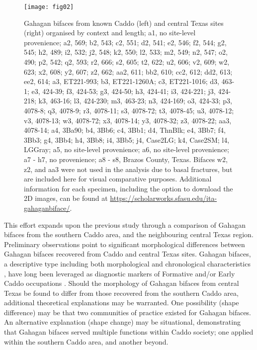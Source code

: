 \documentclass[review]{elsarticle}
\begin{document}
\begin{figure}[htbp]\centering
\texttt{[image: fig02]}
\caption{Gahagan bifaces from known Caddo (left) and central Texas sites (right) organised by context and length; a1, no site-level provenience; a2, 569; b2, 543; c2, 551; d2, 541; e2, 546; f2, 544; g2, 545; h2, 489; i2, 532; j2, 548; k2, 550; l2, 533; m2, 549; n2, 547; o2, 490; p2, 542; q2, 593; r2, 666; s2, 605; t2, 622; u2, 606; v2, 609; w2, 623; x2, 608; y2, 607; z2, 662; aa2, 611; bb2, 610; cc2, 612; dd2, 613; ee2, 614; a3, ET221-993; b3, ET221-1260A; c3, ET221-1016; d3, 463-1; e3, 424-39; f3, 424-53; g3, 424-50; h3, 424-41; i3, 424-221; j3, 424-218; k3, 463-16; l3, 424-230; m3, 463-23; n3, 424-169; o3, 424-33; p3, 4078-8; q3, 4078-9; r3, 4078-11; s3, 4078-72; t3, 4078-45; u3, 4078-12; v3, 4078-13; w3, 4078-72; x3, 4078-14; y3, 4078-32; z3, 4078-22; aa3, 4078-14; a4, 3Ba90; b4, 3Bb6; c4, 3Bb1; d4, ThnBlk; e4, 3Bb7; f4, 3Bb3; g4, 3Bb4; h4, 3Bb8; i4, 3Bb5; j4, Case2LG; k4, Case2SM; l4, LGGray; a5, no site-level provenience; a6, no site-level provenience; a7 - h7, no provenience; a8 - s8, Brazos County, Texas. Bifaces w2, z2, and aa3 were not used in the analysis due to basal fractures, but are included here for visual comparative purposes. Additional information for each specimen, including the option to download the 2D images, can be found at \href{https://scholarworks.sfasu.edu/ita-gahaganbiface/}{https://scholarworks.sfasu.edu/ita-gahaganbiface/}.}
\label{fig:fig2}
\end{figure}

This effort expands upon the previous study through a comparison of Gahagan bifaces from the southern Caddo area, and the neighbouring central Texas region. Preliminary observations point to significant morphological differences between Gahagan bifaces recovered from Caddo and central Texas sites. Gahagan bifaces, a descriptive type including both morphological and chronological characteristics \citep{RN20847}, have long been leveraged as diagnostic markers of Formative and/or Early Caddo occupations \citep{RN4924,RN3684}. Should the morphology of Gahagan bifaces from central Texas be found to differ from those recovered from the southern Caddo area, additional theoretical explanations may be warranted. One possibility (shape difference) may be that two communities of practice existed for Gahagan bifaces. An alternative explanation (shape change) may be situational, demonstrating that Gahagan bifaces served multiple functions within Caddo society; one applied within the southern Caddo area, and another beyond.
\end{document}
